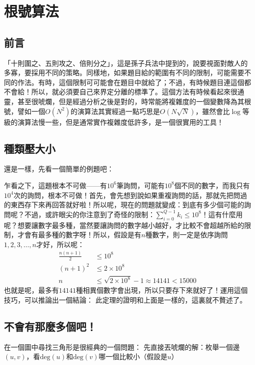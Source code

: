 \chapter{根號算法}
\section{前言}
	「十則圍之、五則攻之、倍則分之」，這是孫子兵法中提到的，說要視面對敵人的多寡，要採用不同的策略。同樣地，如果題目給的範圍有不同的限制，可能需要不同的作法。有時，這個限制可可能會在題目中就給了；不過，有時候題目連這個都不會給！所以，就必須要自己來界定分離的標準了。這個方法有時候看起來很通靈，甚至很唬爛，但是經過分析之後是對的，時常能將複雜度的一個變數降為其根號，譬如一個$O(N^2)$的演算法其實經過一點巧思是$O(N\sqrt{N})$，雖然會比$\log$等級的演算法慢一些，但是通常實作複雜度低許多，是一個很實用的工具！

\section{種類壓大小}
	還是一樣，先看一個簡單的例題吧：

	乍看之下，這題根本不可做——有$10^6$筆詢問，可能有$10^8$個不同的數字，而我只有$10^4$次的詢問，根本不可做！首先，會先想到說如果重複詢問的話，那就先把問過的東西存下來再回答就好啦！所以呢，現在的問題就變成：到底有多少個可能的詢問呢？不過，或許眼尖的你注意到了奇怪的限制：$\sum^{Q - 1}_{i = 0} k_i \leq 10^8$！這有什麼用呢？想要讓數字最多種，當然要讓詢問的數字越小越好，才比較不會超越所給的限制，才會有最多種的數字呀！所以，假設是有$n$種數字，則一定是依序詢問$1, 2, 3, \dots, n$才好，所以呢：
	\begin{align*}
		\frac{n(n + 1)}{2} &\leq 10^8\\	
		(n + 1)^2 &\leq 2 \times 10^8\\
		n &\leq \sqrt{2 \times 10^8} - 1 \approx 14141 < 15000
	\end{align*}
	也就是呢，最多有$14141$種相異個數字會出現，所以只要存下來就好了！運用這個技巧，可以推論出一個結論：
	此定理的證明和上面是一樣的，這裏就不贅述了。

\section{不會有那麼多個吧！}
	在一個圖中尋找三角形是很經典的一個問題：
	先直接丟唬爛的解：枚舉一個邊$(u, v)$，看$\text{deg}(u)$和$\text{deg}(v)$哪一個比較小（假設是$u$）
